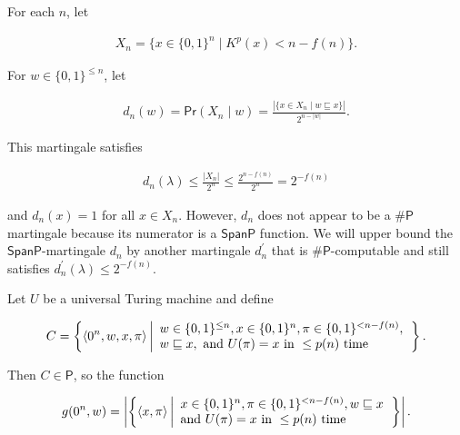 \documentclass[10pt,a4paper]{article}
\begin{document}
For each $n$, let\par


\[\begin{gathered}
X_{n}=\{x\in\{0,1\}^{n}\mid K^{p}(x)<n-f(n)\}.
\end{gathered}\]


For $w\in\{0,1\}^{\leq n}$, let\par


\[\begin{gathered}
d_{n}(w)=\mathsf{Pr}(X_{n}\mid w)=\frac{|\{x\in X_{n}\mid w\sqsubseteq x\}|}{2^{n-|w|}}.
\end{gathered}\]


This martingale satisfies\par


\[\begin{gathered}
d_{n}(\lambda)\leq\frac{|X_{n}|}{2^{n}}\leq\frac{2^{n-f(n)}}{2^{n}}=2^{-f(n)}
\end{gathered}\]


and $d_{n}(x)=1$ for all $x\in X_{n}$. However, $d_{n}$ does not appear to be a ${\mathsf{\#}\mathsf{P}}$ martingale because its numerator is a $\mathsf{SpanP}$ function.
We will upper bound the $\mathsf{SpanP}$-martingale $d_{n}$ by another martingale $d_{n}^{\prime}$ that is ${\mathsf{\#}\mathsf{P}}$-computable and still satisfies $d_{n}^{\prime}(\lambda)\leq 2^{-f(n)}.$\par




Let $U$ be a universal Turing machine and define\par


\[\begin{gathered}
C=\left\{\langle 0^{n},w,x,\pi\rangle\left|\begin{array}[]{l}w\in\{0,1\}^{\leq
n},x\in\{0,1\}^{n},\pi\in\{0,1\}^{<n-f(n)},\\
w\sqsubseteq x,\textrm{ and }U(\pi)=x\textrm{ in }\leq p(n)\textrm{ time}\end{array}\right.\right\}.
\end{gathered}\]


Then $C\in\mathsf{P}$, so the function\par


\[\begin{gathered}
g(0^{n},w)=\left|\left\{\langle x,\pi\rangle\left|\begin{array}[]{l}x\in\{0,1\}^{n},\pi\in\{0,1\}^{<n-f(n)},w\sqsubseteq x\\
\textrm{and }U(\pi)=x\textrm{ in }\leq p(n)\textrm{ time}\end{array}\right.\right\}\right|.
\end{gathered}\]
\end{document}
